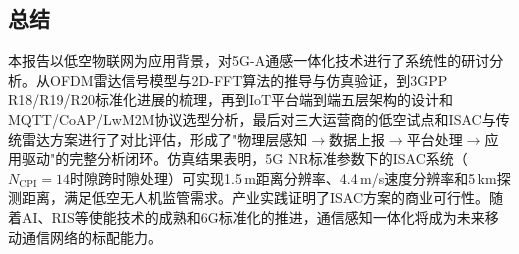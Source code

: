 \subsection{总结}

本报告以低空物联网为应用背景，对5G-A通感一体化技术进行了系统性的研讨分析。从OFDM雷达信号模型与2D-FFT算法的推导与仿真验证，到3GPP R18/R19/R20标准化进展的梳理，再到IoT平台端到端五层架构的设计和MQTT/CoAP/LwM2M协议选型分析，最后对三大运营商的低空试点和ISAC与传统雷达方案进行了对比评估，形成了"物理层感知$\to$数据上报$\to$平台处理$\to$应用驱动"的完整分析闭环。仿真结果表明，5G NR标准参数下的ISAC系统（$N_{\mathrm{CPI}}=14$时隙跨时隙处理）可实现1.5\,m距离分辨率、4.4\,m/s速度分辨率和5\,km探测距离，满足低空无人机监管需求。产业实践证明了ISAC方案的商业可行性。随着AI、RIS等使能技术的成熟和6G标准化的推进，通信感知一体化将成为未来移动通信网络的标配能力。
